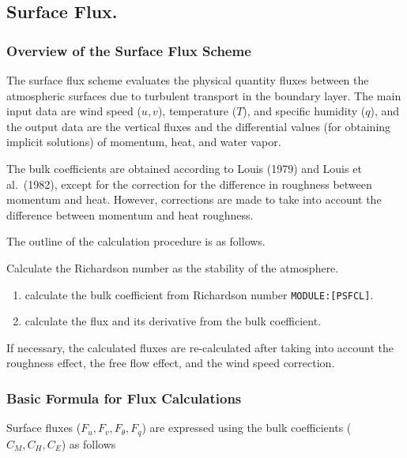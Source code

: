 \hypertarget{surface-flux.}{%
\subsection{Surface Flux.}\label{surface-flux.}}

\hypertarget{overview-of-the-surface-flux-scheme}{%
\subsubsection{Overview of the Surface Flux
Scheme}\label{overview-of-the-surface-flux-scheme}}

The surface flux scheme evaluates the physical quantity fluxes between
the atmospheric surfaces due to turbulent transport in the boundary
layer. The main input data are wind speed (\(u, v\)), temperature
(\(T\)), and specific humidity (\(q\)), and the output data are the
vertical fluxes and the differential values (for obtaining implicit
solutions) of momentum, heat, and water vapor.

The bulk coefficients are obtained according to Louis (1979) and Louis
et al.~(1982), except for the correction for the difference in roughness
between momentum and heat. However, corrections are made to take into
account the difference between momentum and heat roughness.

The outline of the calculation procedure is as follows.

Calculate the Richardson number as the stability of the atmosphere.

\begin{enumerate}
\def\labelenumi{\arabic{enumi}.}
\item
  calculate the bulk coefficient from Richardson number
  \texttt{MODULE:{[}PSFCL{]}}.
\item
  calculate the flux and its derivative from the bulk coefficient.
\end{enumerate}

If necessary, the calculated fluxes are re-calculated after taking into
account the roughness effect, the free flow effect, and the wind speed
correction.

\hypertarget{basic-formula-for-flux-calculations}{%
\subsubsection{Basic Formula for Flux
Calculations}\label{basic-formula-for-flux-calculations}}

Surface fluxes (\(F_u, F_v, F_\theta, F_q\)) are expressed using the
bulk coefficients (\(C_M, C_H, C_E\)) as follows

